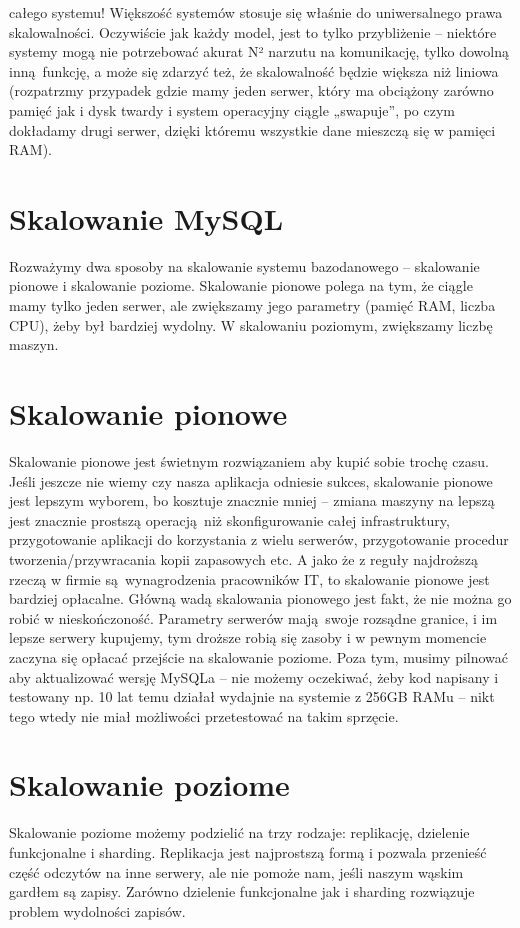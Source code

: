 \documentclass[a4paper,12pt]{article}
\begin{document}
całego systemu! Większość systemów stosuje się właśnie do uniwersalnego prawa skalowalności. Oczywiście jak każdy model, jest to tylko przybliżenie – niektóre systemy mogą nie potrzebować akurat N² narzutu na komunikację, tylko dowolną inną funkcję, a może się zdarzyć też, że skalowalność będzie większa niż liniowa (rozpatrzmy przypadek gdzie mamy jeden serwer, który ma obciążony zarówno pamięć jak i dysk twardy i system operacyjny ciągle „swapuje”, po czym dokładamy drugi serwer, dzięki któremu wszystkie dane mieszczą się w pamięci RAM).

\section{Skalowanie MySQL}

Rozważymy dwa sposoby na skalowanie systemu bazodanowego – skalowanie pionowe i skalowanie poziome. Skalowanie pionowe polega na tym, że ciągle mamy tylko jeden serwer, ale zwiększamy jego parametry (pamięć RAM, liczba CPU), żeby był bardziej wydolny. W skalowaniu poziomym, zwiększamy liczbę maszyn.

\section{Skalowanie pionowe}
Skalowanie pionowe jest świetnym rozwiązaniem aby kupić sobie trochę czasu. Jeśli jeszcze nie wiemy czy nasza aplikacja odniesie sukces, skalowanie pionowe jest lepszym wyborem, bo kosztuje znacznie mniej – zmiana maszyny na lepszą jest znacznie prostszą operacją niż skonfigurowanie całej infrastruktury, przygotowanie aplikacji do korzystania z wielu serwerów, przygotowanie procedur tworzenia/przywracania kopii zapasowych etc. A jako że z reguły najdroższą rzeczą w firmie są wynagrodzenia pracowników IT, to skalowanie pionowe jest bardziej opłacalne. Główną wadą skalowania pionowego jest fakt, że nie można go robić w nieskończoność. Parametry serwerów mają swoje rozsądne granice, i im lepsze serwery kupujemy, tym droższe robią się zasoby i w pewnym momencie zaczyna się opłacać przejście na skalowanie poziome. Poza tym, musimy pilnować aby aktualizować wersję MySQLa – nie możemy oczekiwać, żeby kod napisany i testowany np. 10 lat temu działał wydajnie na systemie z 256GB RAMu – nikt tego wtedy nie miał możliwości przetestować na takim sprzęcie.

\section{Skalowanie poziome}
Skalowanie poziome możemy podzielić na trzy rodzaje: replikację, dzielenie funkcjonalne i sharding. Replikacja jest najprostszą formą i pozwala przenieść część odczytów na inne serwery, ale nie pomoże nam, jeśli naszym wąskim gardłem są zapisy. Zarówno dzielenie funkcjonalne jak i sharding rozwiązuje problem wydolności zapisów.
\end{document}
